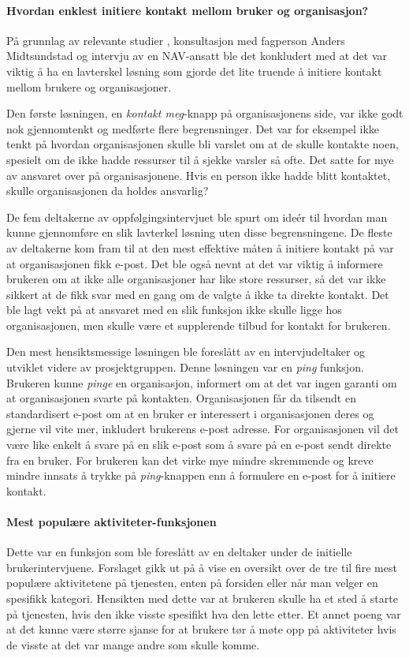 \paragraph{Hvordan enklest initiere kontakt mellom bruker og organisasjon?} 
På grunnlag av relevante studier %
, konsultasjon med fagperson Anders Midtsundstad \cite{MIDTSUNDSTAD-INTERVJU:15} og intervju av en NAV-ansatt \cite{NAV-INTERVJU:16} ble det konkludert med at det var viktig å ha en lavterskel løsning som gjorde det lite truende å initiere kontakt mellom brukere og organisasjoner.

Den første løsningen, en {\em  kontakt meg}-knapp på organisasjonens side, var ikke godt nok gjennomtenkt og medførte flere begrensninger. Det var for eksempel ikke tenkt på hvordan organisasjonen skulle bli varslet om at de skulle kontakte noen, spesielt om de ikke hadde ressurser til å sjekke varsler så ofte. Det satte for mye av ansvaret over på organisasjonene. Hvis en person ikke hadde blitt kontaktet, skulle organisasjonen da holdes ansvarlig?

De fem deltakerne av oppfølgingsintervjuet ble spurt om ideér til hvordan man kunne gjennomføre en slik lavterkel løsning uten disse begrensningene. De fleste av deltakerne kom fram til at den mest effektive måten å initiere kontakt på var at organisasjonen fikk e-post. Det ble også nevnt at det var viktig å informere brukeren om at ikke alle organisasjoner har like store ressurser, så det var ikke sikkert at de fikk svar med en gang om de valgte å ikke ta direkte kontakt. Det ble lagt vekt på at ansvaret med en slik funksjon ikke skulle ligge hos organisasjonen, men skulle være et supplerende tilbud for kontakt for brukeren. 

Den mest hensiktsmessige løsningen ble foreslått av en intervjudeltaker og utviklet videre av prosjektgruppen. Denne løsningen var en {\em ping} funksjon. Brukeren kunne {\em pinge} en organisasjon, informert om at det var ingen garanti om at organisasjonen svarte på kontakten. Organisasjonen får da tilsendt en standardisert e-post om at en bruker er interessert i organisasjonen deres og gjerne vil vite mer, inkludert brukerens e-post adresse. For organisasjonen vil det være like enkelt å svare på en slik e-post som å svare på en e-post sendt direkte fra en bruker. For brukeren kan det virke mye mindre skremmende og kreve mindre innsats å trykke på {\em ping}-knappen enn å formulere en e-post for å initiere kontakt.

\paragraph{Mest populære aktiviteter-funksjonen}
Dette var en funksjon som ble foreslått av en deltaker under de initielle brukerintervjuene. Forslaget gikk ut på å vise en oversikt over de tre til fire mest populære aktivitetene på tjenesten, enten på forsiden eller når man velger en spesifikk kategori. Hensikten med dette var at brukeren skulle ha et sted å starte på tjenesten, hvis den ikke visste spesifikt hva den lette etter. Et annet poeng var at det kunne være større sjanse for at brukere tør å møte opp på aktiviteter hvis de visste at det var mange andre som skulle komme.

